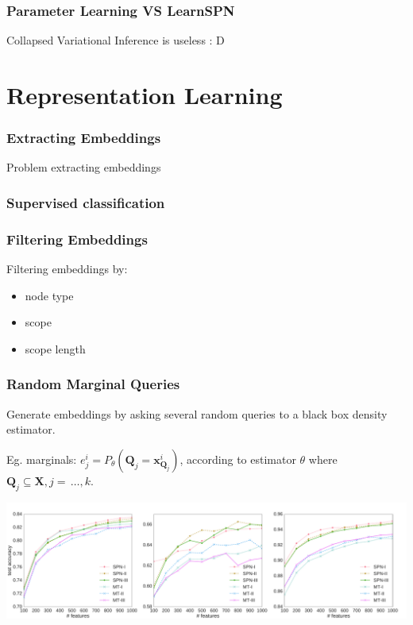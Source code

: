 \documentclass[xcolor={usenames,dvipsnames,svgnames}, compress]{beamer}
\begin{document}
\begin{frame}
  \frametitle{Parameter Learning VS LearnSPN}
  Collapsed Variational Inference is useless : D
\end{frame}

\section{Representation Learning}
{
  \begin{frame}
    \sectionpage
  \end{frame}
}

\begin{frame}
  \frametitle{Extracting Embeddings}
  Problem extracting embeddings
\end{frame}

\begin{frame}
  \frametitle{Supervised classification}
  
\end{frame}

\begin{frame}
  \frametitle{Filtering Embeddings}
  Filtering embeddings by:
  \begin{itemize}
  \item node type
  \item scope
    \item scope length
  \end{itemize}
\end{frame}



\begin{frame}
  \frametitle{Random Marginal Queries}
  Generate embeddings by asking several random queries to a black box
  density estimator.\par
  Eg. marginals: $e^{i}_{j}=P_{\theta}(\mathbf{Q}_{j}=\mathbf{x}^{i}_{\mathbf{Q}_{j}})$,
  according to estimator $\theta$ where $\mathbf{Q}_{j}\subseteq\mathbf{X}, j=\,\dots,k$.
  \begin{center}
    \includegraphics[width=1.0\linewidth]{figures/lines-wide}
  \end{center}
\end{frame}
\end{document}

